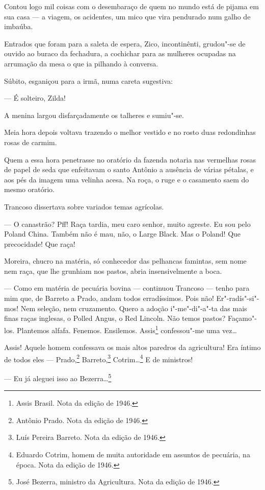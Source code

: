 Contou logo mil coisas com o desembaraço de quem no mundo está de pijama
em sua casa --- a viagem, os acidentes, um mico que vira pendurado num
galho de imbaúba.

Entrados que foram para a saleta de espera, Zico, incontinênti,
grudou"-se de ouvido ao buraco da fechadura, a cochichar para as mulheres
ocupadas na arrumação da mesa o que ia pilhando à conversa.

Súbito, esganiçou para a irmã, numa careta sugestiva:

--- É solteiro, Zilda!

A menina largou disfarçadamente os talheres e sumiu"-se.

Meia hora depois voltava trazendo o melhor vestido e no rosto duas
redondinhas rosas de carmim.

Quem a essa hora penetrasse no oratório da fazenda notaria nas vermelhas
rosas de papel de seda que enfeitavam o santo Antônio a ausência de
várias pétalas, e aos pés da imagem uma velinha acesa. Na roça, o ruge e
o casamento saem do mesmo oratório.

Trancoso dissertava sobre variados temas agrícolas.

--- O canastrão? Pff! Raça tardia, meu caro senhor, muito agreste. Eu
sou pelo Poland China. Também não é mau, não, o Large Black. Mas o
Poland! Que precocidade! Que raça!

Moreira, chucro na matéria, só conhecedor das pelhancas famintas, sem
nome nem raça, que lhe grunhiam nos pastos, abria insensivelmente a
boca.

--- Como em matéria de pecuária bovina --- continuou Trancoso --- tenho
para mim que, de Barreto a Prado, andam todos erradíssimos. Pois não!
Er"-radís"-si"-mos! Nem seleção, nem cruzamento. Quero a adoção
i"-me"-di"-a"-ta das mais finas raças inglesas, o Polled Angus, o Red
Lincoln. Não temos pastos? Façamo"-los. Plantemos alfafa. Fenemos.
Ensilemos. Assis\footnote{Assis Brasil. Nota da edição de 1946.}
confessou"-me uma vez\ldots{}

Assis! Aquele homem confessava os mais altos paredros da agricultura!
Era íntimo de todos eles --- Prado,\footnote{Antônio Prado. Nota da
  edição de 1946.} Barreto,\footnote{Luís Pereira Barreto. Nota da
  edição de 1946.} Cotrim\ldots{}\footnote{Eduardo Cotrim, homem de
  muita autoridade em assuntos de pecuária, na época. Nota da edição de
  1946.} E de ministros!

--- Eu já aleguei isso ao Bezerra\ldots{}\footnote{José Bezerra,
  ministro da Agricultura. Nota da edição de 1946.}

